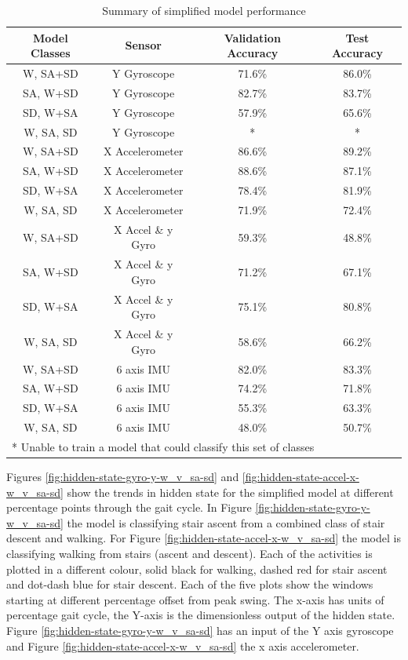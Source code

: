 \documentclass[sensors,article,submit,moreauthors,pdftex]{Definitions/mdpi}
\begin{document}
\begin{table}[!hbt]
    \centering
    \caption{Summary of simplified model performance}
    \label{tab:simplified_model_perfomances}
    \begin{tabular}{cccc}
        \textbf{Model Classes} & \textbf{Sensor} & \textbf{Validation Accuracy} & \textbf{Test Accuracy}\\
        \hline
        W, SA+SD & Y Gyroscope & 71.6\% & 86.0\% \\
        SA, W+SD & Y Gyroscope & 82.7\% & 83.7\% \\
        SD, W+SA & Y Gyroscope & 57.9\% & 65.6\% \\
        W, SA, SD & Y Gyroscope & * & * \\
        W, SA+SD & X Accelerometer & 86.6\% & 89.2\% \\
        SA, W+SD & X Accelerometer & 88.6\% & 87.1\% \\
        SD, W+SA & X Accelerometer & 78.4\% & 81.9\% \\
        W, SA, SD & X Accelerometer & 71.9\% & 72.4\%\\
        W, SA+SD & X Accel \& y Gyro & 59.3\% & 48.8\% \\
        SA, W+SD & X Accel \& y Gyro & 71.2\% & 67.1\% \\
        SD, W+SA & X Accel \& y Gyro & 75.1\% & 80.8\% \\
        W, SA, SD & X Accel \& y Gyro & 58.6\% & 66.2\%\\
        W, SA+SD & 6 axis IMU & 82.0\% & 83.3\% \\
        SA, W+SD & 6 axis IMU & 74.2\% & 71.8\% \\
        SD, W+SA & 6 axis IMU & 55.3\% & 63.3\% \\
        W, SA, SD & 6 axis IMU & 48.0\% & 50.7\%\\
        \multicolumn{4}{l}{\footnotesize{* Unable to train a model that could classify this set of classes}}
    \end{tabular}
\end{table}

Figures \ref{fig:hidden-state-gyro-y-w_v_sa-sd} and \ref{fig:hidden-state-accel-x-w_v_sa-sd} show the trends in hidden state for the simplified model at different percentage points through the gait cycle. In Figure \ref{fig:hidden-state-gyro-y-w_v_sa-sd} the model is classifying stair ascent from a combined class of stair descent and walking. For Figure \ref{fig:hidden-state-accel-x-w_v_sa-sd} the model is classifying walking from stairs (ascent and descent). Each of the activities is plotted in a different colour, solid black for walking, dashed red for stair ascent and dot-dash blue for stair descent. Each of the five plots show the windows starting at different percentage offset from peak swing. The x-axis has units of percentage gait cycle, the Y-axis is the dimensionless output of the hidden state. Figure \ref{fig:hidden-state-gyro-y-w_v_sa-sd} has an input of the Y axis gyroscope and Figure \ref{fig:hidden-state-accel-x-w_v_sa-sd} the x axis accelerometer.
\end{document}

